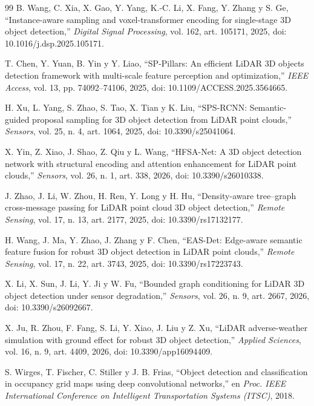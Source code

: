 \documentclass[11pt,letterpaper]{article}
\begin{document}
\begin{thebibliography}{99}
B. Wang, C. Xia, X. Gao, Y. Yang, K.-C. Li, X. Fang, Y. Zhang y S. Ge, ``Instance-aware sampling and voxel-transformer encoding for single-stage 3D object detection,'' \emph{Digital Signal Processing}, vol. 162, art. 105171, 2025, doi: 10.1016/j.dsp.2025.105171.

T. Chen, Y. Yuan, B. Yin y Y. Liao, ``SP-Pillars: An efficient LiDAR 3D objects detection framework with multi-scale feature perception and optimization,'' \emph{IEEE Access}, vol. 13, pp. 74092--74106, 2025, doi: 10.1109/ACCESS.2025.3564665.

H. Xu, L. Yang, S. Zhao, S. Tao, X. Tian y K. Liu, ``SPS-RCNN: Semantic-guided proposal sampling for 3D object detection from LiDAR point clouds,'' \emph{Sensors}, vol. 25, n.\textordmasculine{} 4, art. 1064, 2025, doi: 10.3390/s25041064.

X. Yin, Z. Xiao, J. Shao, Z. Qiu y L. Wang, ``HFSA-Net: A 3D object detection network with structural encoding and attention enhancement for LiDAR point clouds,'' \emph{Sensors}, vol. 26, n.\textordmasculine{} 1, art. 338, 2026, doi: 10.3390/s26010338.

J. Zhao, J. Li, W. Zhou, H. Ren, Y. Long y H. Hu, ``Density-aware tree--graph cross-message passing for LiDAR point cloud 3D object detection,'' \emph{Remote Sensing}, vol. 17, n.\textordmasculine{} 13, art. 2177, 2025, doi: 10.3390/rs17132177.

H. Wang, J. Ma, Y. Zhao, J. Zhang y F. Chen, ``EAS-Det: Edge-aware semantic feature fusion for robust 3D object detection in LiDAR point clouds,'' \emph{Remote Sensing}, vol. 17, n.\textordmasculine{} 22, art. 3743, 2025, doi: 10.3390/rs17223743.

X. Li, X. Sun, J. Li, Y. Ji y W. Fu, ``Bounded graph conditioning for LiDAR 3D object detection under sensor degradation,'' \emph{Sensors}, vol. 26, n.\textordmasculine{} 9, art. 2667, 2026, doi: 10.3390/s26092667.

X. Ju, R. Zhou, F. Fang, S. Li, Y. Xiao, J. Liu y Z. Xu, ``LiDAR adverse-weather simulation with ground effect for robust 3D object detection,'' \emph{Applied Sciences}, vol. 16, n.\textordmasculine{} 9, art. 4409, 2026, doi: 10.3390/app16094409.

S. Wirges, T. Fischer, C. Stiller y J. B. Frias, ``Object detection and classification in occupancy grid maps using deep convolutional networks,'' en \emph{Proc. IEEE International Conference on Intelligent Transportation Systems (ITSC)}, 2018.


\end{thebibliography}
\end{document}
